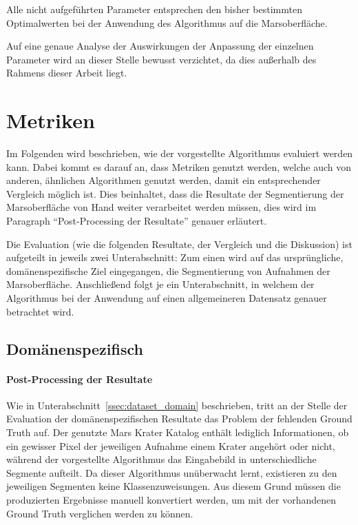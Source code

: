 Alle nicht aufgeführten Parameter entsprechen den bisher bestimmten Optimalwerten bei der Anwendung des Algorithmus auf die Marsoberfläche.

Auf eine genaue Analyse der Auswirkungen der Anpassung der einzelnen Parameter wird an dieser Stelle bewusst verzichtet, da dies außerhalb des Rahmens dieser Arbeit liegt.

\section{Metriken}
\label{sec:metriken}

Im Folgenden wird beschrieben, wie der vorgestellte Algorithmus evaluiert werden kann. Dabei kommt es darauf an, dass Metriken genutzt werden, welche auch von anderen, ähnlichen Algorithmen genutzt werden, damit ein entsprechender Vergleich möglich ist. Dies beinhaltet, dass die Resultate der Segmentierung der Marsoberfläche von Hand weiter verarbeitet werden müssen, dies wird im Paragraph \enquote{Post-Processing der Resultate} genauer erläutert.

Die Evaluation (wie die folgenden Resultate, der Vergleich und die Diskussion) ist aufgeteilt in jeweils zwei Unterabschnitt: Zum einen wird auf das ursprüngliche, domänenspezifische Ziel eingegangen, die Segmentierung von Aufnahmen der Marsoberfläche. Anschließend folgt je ein Unterabschnitt, in welchem der Algorithmus bei der Anwendung auf einen allgemeineren Datensatz genauer betrachtet wird.

\subsection{Domänenspezifisch}
\label{ssec:evaluation_domain}

\paragraph{Post-Processing der Resultate}

Wie in Unterabschnitt~\ref{ssec:dataset_domain} beschrieben, tritt an der Stelle der Evaluation der domänenspezifischen Resultate das Problem der fehlenden Ground Truth auf. Der genutzte Mars Krater Katalog \cite{robbins_12} enthält lediglich Informationen, ob ein gewisser Pixel der jeweiligen Aufnahme einem Krater angehört oder nicht, während der vorgestellte Algorithmus das Eingabebild in unterschiedliche Segmente aufteilt. Da dieser Algorithmus unüberwacht lernt, existieren zu den jeweiligen Segmenten keine Klassenzuweisungen. Aus diesem Grund müssen die produzierten Ergebnisse manuell konvertiert werden, um mit der vorhandenen Ground Truth verglichen werden zu können.

